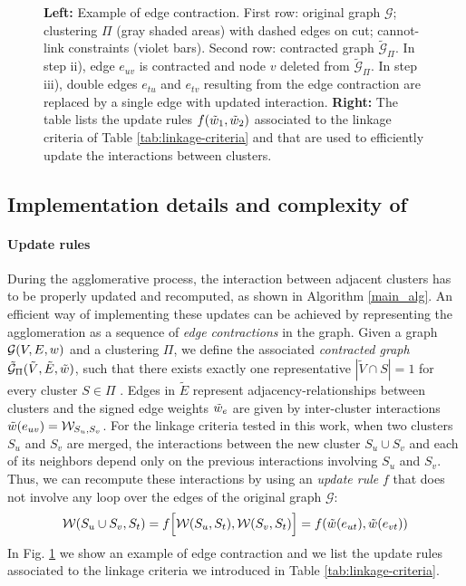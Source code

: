 \begin{figure}
\begin{minipage}[T]{0.48\textwidth}
\begin{tabular}[b]{r | l }
        \end{tabular}
\end{minipage}
\caption{ 
\textbf{Left:} Example of edge contraction. First row: original graph $\mathcal{G}$; clustering $\Pi$ (gray shaded areas) with dashed edges on cut; cannot-link constraints (violet bars). Second row: contracted graph $\tilde{\mathcal{G}}_\Pi$. In step ii), edge $e_{uv}$ is contracted and node $v$ deleted from $\tilde{\mathcal{G}}_\Pi$. In step iii), double edges $e_{tu}$ and $e_{tv}$ resulting from the edge contraction are replaced by a single edge with updated interaction. \textbf{Right:} The table lists the update rules $f(\tilde{w}_1, \tilde{w}_2)$ associated to the linkage criteria of Table \ref{tab:linkage-criteria} and that are used to efficiently update the interactions between clusters.}
\label{fig:edge_contraction_and_contr_graph}  
\end{figure}



\subsection{Implementation details and complexity of \algname{}} \label{sec:detailed_impl}

\paragraph*{Update rules} During the agglomerative process, the interaction between adjacent clusters has to be properly updated and recomputed, as shown in Algorithm \ref{main_alg}.  
An efficient way of implementing these updates can be achieved by representing the agglomeration as a sequence of \emph{edge contractions} in the graph. Given a graph $\mathcal{G}(V,E,w)$ and a clustering $\Pi$, we define the associated \emph{contracted graph} $\tilde{\mathcal{G}}_\Pi(\tilde{V}, \tilde{E}, \tilde{w})$, such that there exists exactly one representative $|\tilde{V} \cap S| = 1$ for every cluster $S \in \Pi$ . Edges in $\tilde{E}$ represent adjacency-relationships between clusters 
and the signed edge weights $\tilde{w}_e$ are given by inter-cluster interactions $\tilde{w}(e_{uv})=\mathcal{W}_{S_u,S_v}$. 
For the linkage criteria tested in this work, when two clusters $S_u$ and $S_v$ are merged, the interactions between the new cluster $S_u \cup S_v$ and each of its neighbors depend only on the previous interactions involving $S_u$ and $S_v$. Thus, we can recompute these interactions by using an \emph{update rule} $f$ that does not involve any loop over the edges of the original graph $\mathcal{G}$:
\begin{equation}
  \mathcal{W}(S_u \cup S_v,S_t) = f\Big[ \mathcal{W}(S_u,S_t), \mathcal{W}(S_v,S_t) \Big] = f(\tilde{w}(e_{ut}), \tilde{w}(e_{vt})) 
\end{equation}
In Fig. \ref{fig:edge_contraction_and_contr_graph} we show an example of edge contraction and we list the update rules associated to the linkage criteria we introduced in Table \ref{tab:linkage-criteria}.


